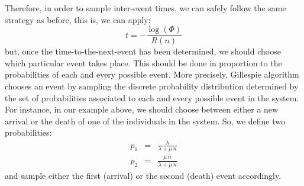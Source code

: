 Therefore, in order to sample inter-event times, we can safely follow the same strategy as before, this is, we can apply:
\begin{equation}
t     = -\frac{\log(\Phi)}{R(n)}
\label{Random_Time_General}
\end{equation}
but, once the time-to-the-next-event has been determined, we should choose which particular event takes place. This should be done in proportion to the probabilities of each and every possible event. More precisely, Gillespie algorithm chooses an event by sampling the discrete probability distribution determined by the set of probabilities associated to each and every possible event in the system. For instance, in our example above, we should choose between either a new arrival or the death of one of the individuals in the system. So, we define two probabilities:
\begin{eqnarray}
p_1 &=& \frac{\lambda}{\lambda + \mu\,n} \nonumber \\
p_2 &=& \frac{\mu\,n}{\lambda + \mu\,n}  \label{p_1p_2}
\end{eqnarray}
and sample either the first (arrival) or the second (death) event accordingly. 
\smallskip

